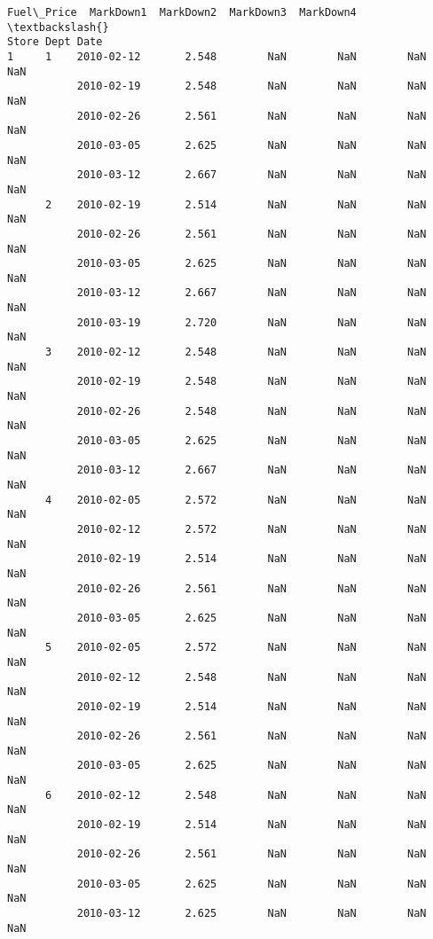\documentclass[11pt]{article}
\begin{document}
\begin{Verbatim}[commandchars=\\\{\}]
                       Fuel\_Price  MarkDown1  MarkDown2  MarkDown3  MarkDown4  \textbackslash{}
Store Dept Date                                                                 
1     1    2010-02-12       2.548        NaN        NaN        NaN        NaN   
           2010-02-19       2.548        NaN        NaN        NaN        NaN   
           2010-02-26       2.561        NaN        NaN        NaN        NaN   
           2010-03-05       2.625        NaN        NaN        NaN        NaN   
           2010-03-12       2.667        NaN        NaN        NaN        NaN   
      2    2010-02-19       2.514        NaN        NaN        NaN        NaN   
           2010-02-26       2.561        NaN        NaN        NaN        NaN   
           2010-03-05       2.625        NaN        NaN        NaN        NaN   
           2010-03-12       2.667        NaN        NaN        NaN        NaN   
           2010-03-19       2.720        NaN        NaN        NaN        NaN   
      3    2010-02-12       2.548        NaN        NaN        NaN        NaN   
           2010-02-19       2.548        NaN        NaN        NaN        NaN   
           2010-02-26       2.548        NaN        NaN        NaN        NaN   
           2010-03-05       2.625        NaN        NaN        NaN        NaN   
           2010-03-12       2.667        NaN        NaN        NaN        NaN   
      4    2010-02-05       2.572        NaN        NaN        NaN        NaN   
           2010-02-12       2.572        NaN        NaN        NaN        NaN   
           2010-02-19       2.514        NaN        NaN        NaN        NaN   
           2010-02-26       2.561        NaN        NaN        NaN        NaN   
           2010-03-05       2.625        NaN        NaN        NaN        NaN   
      5    2010-02-05       2.572        NaN        NaN        NaN        NaN   
           2010-02-12       2.548        NaN        NaN        NaN        NaN   
           2010-02-19       2.514        NaN        NaN        NaN        NaN   
           2010-02-26       2.561        NaN        NaN        NaN        NaN   
           2010-03-05       2.625        NaN        NaN        NaN        NaN   
      6    2010-02-12       2.548        NaN        NaN        NaN        NaN   
           2010-02-19       2.514        NaN        NaN        NaN        NaN   
           2010-02-26       2.561        NaN        NaN        NaN        NaN   
           2010-03-05       2.625        NaN        NaN        NaN        NaN   
           2010-03-12       2.625        NaN        NaN        NaN        NaN   

\end{Verbatim}
\end{document}
